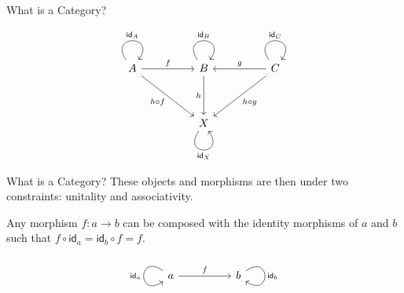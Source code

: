 \documentclass{beamer}
\begin{document}
\begin{frame}[fragile]{What is a Category?}
    \begin{definition}[Category]
        \vspace*{0.125in}
        \[\begin{tikzcd}
                A && B && C \\
                \\
                && X
                \arrow["{\mathsf{id}_A}", from=1-1, to=1-1, loop, in=55, out=125, distance=10mm]
                \arrow["f", from=1-1, to=1-3]
                \arrow["{h \circ f}"', from=1-1, to=3-3]
                \arrow["{\mathsf{id}_B}", from=1-3, to=1-3, loop, in=55, out=125, distance=10mm]
                \arrow["h"', from=1-3, to=3-3]
                \arrow["g"', from=1-5, to=1-3]
                \arrow["{\mathsf{id}_C}", from=1-5, to=1-5, loop, in=55, out=125, distance=10mm]
                \arrow["{h \circ g}", from=1-5, to=3-3]
                \arrow["{\mathsf{id}_X}"', from=3-3, to=3-3, loop, in=305, out=235, distance=10mm]
            \end{tikzcd}\]
    \end{definition}
\end{frame}


\begin{frame}[fragile]{What is a Category?}
    These objects and morphisms are then under two constraints: unitality and associativity.
    \begin{definition}
        Any morphism $f:a\rightarrow b$ can be composed with the identity morphisms of $a$ and $b$ such that $f\circ \mathsf{id}_a=\mathsf{id}_b\circ f=f$.
        \[\begin{tikzcd}
                a && b
                \arrow["{\mathsf{id}_a}"', from=1-1, to=1-1, loop, in=215, out=145, distance=10mm]
                \arrow["f", from=1-1, to=1-3]
                \arrow["{\mathsf{id}_b}", from=1-3, to=1-3, loop, in=325, out=35, distance=10mm]
            \end{tikzcd}\]
    \end{definition}
\end{frame}
\end{document}
